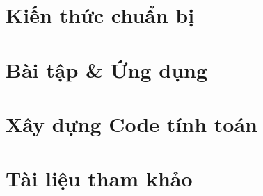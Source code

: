 \documentclass[a4paper,oneside,12pt]{report}
\begin{document}

\thispagestyle{empty}
\cleardoublepage
{}



\cleardoublepage
{}

\chapter{Kiến thức chuẩn bị}





\chapter{Bài tập \& Ứng dụng}


\chapter{Xây dựng Code tính toán}


\chapter*{Tài liệu tham khảo}

\end{document}
